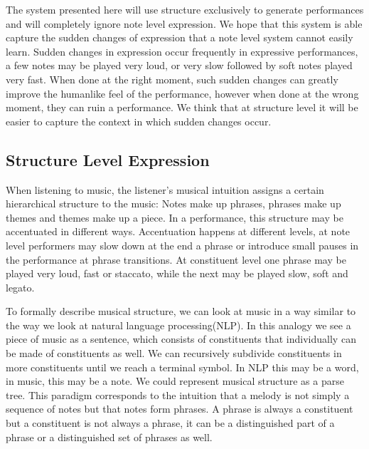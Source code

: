 \documentclass[a4paper,10pt]{article}
\begin{document}
The system presented here will use structure exclusively to generate performances and will completely ignore note level expression. We hope that this system is able capture the sudden changes of expression that a note level system cannot easily learn. Sudden changes in expression occur frequently in expressive performances, a few notes may be played very loud, or very slow followed by soft notes played very fast. When done at the right moment, such sudden changes can greatly improve the humanlike feel of the performance, however when done at the wrong moment, they can ruin a performance. We think that at structure level it will be easier to capture the context in which sudden changes occur. 




\subsection{Structure Level Expression}
When listening to music, the listener's musical intuition assigns a certain hierarchical structure to the music: Notes make up phrases, phrases make up themes and themes make up a piece. In a performance, this structure may be accentuated in different ways. Accentuation happens at different levels, at note level performers may slow down at the end a phrase or introduce small pauses in the performance at phrase transitions. At constituent level one phrase may be played very loud, fast or staccato, while the next may be played slow, soft and legato. 

To formally describe musical structure, we can look at music in a way similar to the way we look at natural language processing(NLP). In this analogy we see a piece of music as a sentence, which consists of constituents that individually can be made of constituents as well. We can recursively subdivide constituents in more constituents until we reach a terminal symbol. In NLP this may be a word, in music, this may be a note. We could represent musical structure as a parse tree. This paradigm corresponds to the intuition that a melody is not simply a sequence of notes but that notes form phrases. A phrase is always a constituent but a constituent is not always a phrase, it can be a distinguished part of a phrase or a distinguished set of phrases as well. 
\end{document}
